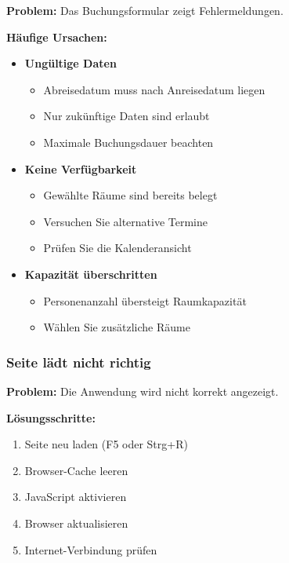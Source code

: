 \textbf{Problem:} Das Buchungsformular zeigt Fehlermeldungen.

\textbf{Häufige Ursachen:}

\begin{itemize}
    \item \textbf{Ungültige Daten}
        \begin{itemize}
            \item Abreisedatum muss nach Anreisedatum liegen
            \item Nur zukünftige Daten sind erlaubt
            \item Maximale Buchungsdauer beachten
        \end{itemize}
    \item \textbf{Keine Verfügbarkeit}
        \begin{itemize}
            \item Gewählte Räume sind bereits belegt
            \item Versuchen Sie alternative Termine
            \item Prüfen Sie die Kalenderansicht
        \end{itemize}
    \item \textbf{Kapazität überschritten}
        \begin{itemize}
            \item Personenanzahl übersteigt Raumkapazität
            \item Wählen Sie zusätzliche Räume
        \end{itemize}
\end{itemize}

\subsubsection{Seite lädt nicht richtig}

\textbf{Problem:} Die Anwendung wird nicht korrekt angezeigt.

\textbf{Lösungsschritte:}

\begin{enumerate}
    \item Seite neu laden (F5 oder Strg+R)
    \item Browser-Cache leeren
    \item JavaScript aktivieren
    \item Browser aktualisieren
    \item Internet-Verbindung prüfen
\end{enumerate}

